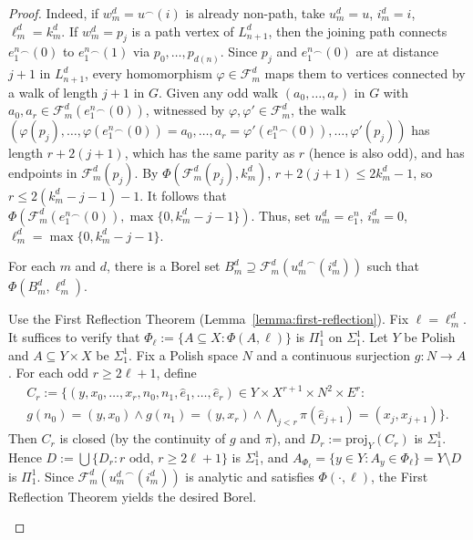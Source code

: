 \begin{proof}
    Indeed, if $w^d_m=u^\smallfrown(i)$ is already non-path, take $u^d_m=u$, $i^d_m=i$, $\ell^d_m=k^d_m$.
    If $w^d_m=p_j$ is a path vertex of $L^d_{n+1}$, then the joining path connects $e_1^n{}^\smallfrown(0)$ to $e_1^n{}^\smallfrown(1)$ via $p_0,\dots,p_{d(n)}$.
    Since $p_j$ and $e_1^n{}^\smallfrown(0)$ are at distance $j+1$ in $L^d_{n+1}$, every homomorphism $\varphi\in\mathcal F^d_m$ maps them to vertices connected by a walk of length $j+1$ in $G$.
    Given any odd walk $(a_0,\dots,a_r)$ in $G$ with $a_0,a_r\in\mathcal F^d_m(e_1^n{}^\smallfrown(0))$, witnessed by $\varphi,\varphi'\in\mathcal F^d_m$, the walk $(\varphi(p_j),\dots,\varphi(e_1^n{}^\smallfrown(0))=a_0,\dots,a_r=\varphi'(e_1^n{}^\smallfrown(0)),\dots,\varphi'(p_j))$ has length $r+2(j+1)$, which has the same parity as $r$ (hence is also odd), and has endpoints in $\mathcal F^d_m(p_j)$.
    By $\Phi(\mathcal F^d_m(p_j),k^d_m)$, $r+2(j+1)\leq 2k^d_m-1$, so $r\leq 2(k^d_m-j-1)-1$.
    It follows that $\Phi(\mathcal F^d_m(e_1^n{}^\smallfrown(0)),\max\{0,k^d_m-j-1\})$.
    Thus, set $u^d_m=e_1^n$, $i^d_m=0$, $\ell^d_m=\max\{0,k^d_m-j-1\}$.
    
    \begin{claim}\label{claim:separation_odd-walks}
        For each $m$ and $d$, there is a Borel set $B^d_m\supseteq\mathcal F^d_m({u^d_m}^\smallfrown(i^d_m))$ such that $\Phi(B^d_m,\ell^d_m)$.
    \end{claim}

    \begin{claimproof}
        Use the First Reflection Theorem (Lemma~\ref{lemma:first-reflection}).
        Fix $\ell=\ell^d_m$.
        It suffices to verify that $\Phi_\ell:=\{A\subseteq X:\Phi(A,\ell)\}$ is $\Pi^1_1$ on $\Sigma^1_1$.
        Let $Y$ be Polish and $A\subseteq Y\times X$ be $\Sigma^1_1$.
        Fix a Polish space $N$ and a continuous surjection $g\colon N\to A$.
        For each odd $r\geq 2\ell+1$, define
        \begin{align*}
            C_r:=\{(y,x_0,\dots,x_r,n_0,n_1,\hat e_1,\dots,\hat e_r)\in Y\times X^{r+1}\times N^2\times E^r:{}\\
            g(n_0)=(y,x_0)\land g(n_1)=(y,x_r)\land\textstyle\bigwedge_{j<r}\pi(\hat e_{j+1})=(x_j,x_{j+1})\}.
        \end{align*}
        Then $C_r$ is closed (by the continuity of $g$ and $\pi$), and $D_r:=\mathrm{proj}_Y(C_r)$ is $\Sigma^1_1$.
        Hence $D:=\bigcup\{D_r:r\text{ odd},\,r\geq 2\ell+1\}$ is $\Sigma^1_1$, and $A_{\Phi_\ell}=\{y\in Y:A_y\in\Phi_\ell\}=Y\setminus D$
        is $\Pi^1_1$.
        Since $\mathcal F^d_m({u^d_m}^\smallfrown(i^d_m))$ is analytic and satisfies $\Phi(\cdot,\ell)$, the First Reflection Theorem yields the desired Borel.
    \end{claimproof}


\end{proof}
